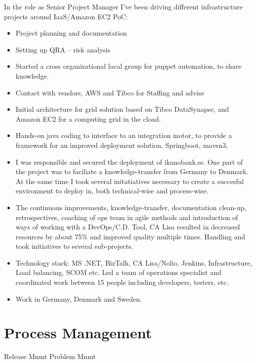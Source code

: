 \documentclass[11pt,a4paper,sans]{moderncv}
\begin{document}
In the role as Senior Project Manager I’ve been driving different infrastructure projects around IaaS/Amazon EC2 PoC: 
\begin{itemize}
    \item Project planning and documentation 
    \item Setting up QRA – risk analysis  
    \item Started a cross organizational local group for puppet automation, to share knowledge.
    \item Contact with vendors, AWS and Tibco for Staffing and advise 
    \item Initial architecture for grid solution based on Tibco DataSynapse, and Amazon EC2 for a computing grid in the cload. 
    \item Hands-on java coding to interface to an integration motor, to provide a framework for an improved deployment solution. Springboot, maven3,  
\end{itemize}


\begin{itemize}
    \item I was responsible and secured the deployment of ikanobank.se. One part of the project was to faciliate a knowledge-transfer from Germany to Denmark. At the same time I took several initatiatives necessary to create a succesful environment to deploy in, both technical-wise and process-wise. 
    
    \item The continuous improvements, knowledge-transfer, documentation clean-up, retrospectives, coaching of ops team in agile methods and introduction of ways of working with a DevOps/C.D. Tool, CA Lisa resulted in decreased resources by about 75\% and improved quality multiple times. Handling and took initiatives to several sub-projects. 
    
    \item Technology stack: MS .NET, BizTalk, CA Lisa/Nolio, Jenkins, Infrastructure, Load balancing, SCOM etc. Led a team of operations specialist and coordinated work between 15 people including developers, testers, etc. 
    
    \item Work in Germany, Denmark and Sweden. 
\end{itemize}

\section{Process Management}
 {Release Mnmt}
 {Problem Mnmt}
\end{document}
